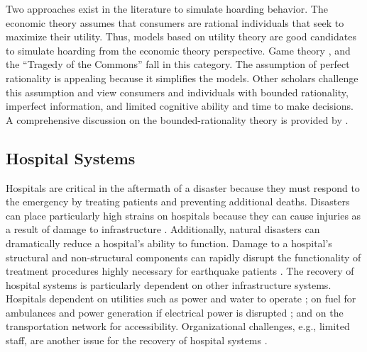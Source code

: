 Two approaches exist in the literature to simulate hoarding behavior. The economic theory assumes that consumers are rational individuals that seek to maximize their utility. Thus, models based on utility theory are good candidates to simulate hoarding from the economic theory perspective. Game theory \citep{hallsworth2000urban}, and the ``Tragedy of the Commons'' \citep{hardin2009tragedy} fall in this category. The assumption of perfect rationality is appealing because it simplifies the models. Other scholars challenge this assumption and view consumers and individuals with bounded rationality, imperfect information, and limited cognitive ability and time to make decisions. A comprehensive discussion on the bounded-rationality theory is provided by \citet{sep-bounded-rationality}. \

\subsection{Hospital Systems}
Hospitals are critical in the aftermath of a disaster because they must respond to the emergency by treating patients and preventing additional deaths. Disasters can place particularly high strains on hospitals because they can cause injuries as a result of damage to infrastructure \citep{jun2010analysis, ceferino2018regional, ceferino2018probabilistic, johnston20142010,}. Additionally, natural disasters can dramatically reduce a hospital's ability to function. Damage to a hospital's structural and non-structural components can rapidly disrupt the functionality of treatment procedures highly necessary for earthquake patients \citep{bambaren2011a3, mitrani2012functional}. The recovery of hospital systems is particularly dependent on other infrastructure systems. Hospitals dependent on utilities such as power and water to operate \citep{McDaniels2008, Hiete2011, Achour2014, jacques2014resilience, McDaniels2008}; on fuel for ambulances and power generation if electrical power is disrupted \citep{Hiete2011}; and on the transportation network for accessibility. Organizational challenges, e.g., limited staff, are another issue for the recovery of hospital systems \citep{Cimellaro2016}. \

